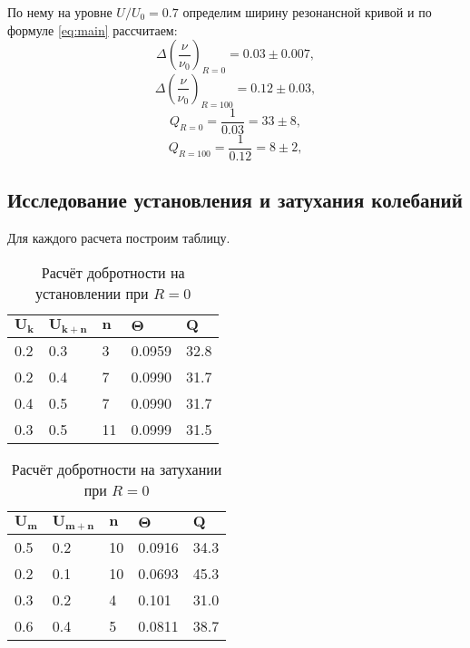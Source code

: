 \documentclass[a4paper]{article}
\begin{document}
По нему на уровне $ U/U_0 = 0.7 $ определим ширину резонансной кривой и по формуле \eqref{eq:main} рассчитаем:
\begin{equation*}\label{key}
	\Delta (\frac{\nu}{\nu_0})_{R=0} = 0.03 \pm 0.007,
\end{equation*}
\begin{equation*}\label{key}
	\Delta (\frac{\nu}{\nu_0})_{R=100} = 0.12 \pm 0.03 ,
\end{equation*}
\begin{equation}\label{key}
	Q_{R=0} = \frac{1}{0.03} = 33 \pm 8,
\end{equation}
\begin{equation}\label{key}
	Q_{R=100} = \frac{1}{0.12} = 8 \pm 2,
\end{equation}

\subsection{Исследование установления и затухания колебаний}

Для каждого расчета построим таблицу.

\begin{table}[h!]
	\centering
	\begin{tabular}{|l|l|l|l|l|}
		\hline
		$\mathbf{U_k}$ & $\mathbf{U_{k+n}}$ & $\mathbf{n}$ & $\mathbf{\Theta}$ & $\mathbf{Q}$  \\ \hline
		0.2   & 0.3     & 3   & 0.0959   & 32.8 \\ \hline
		0.2   & 0.4     & 7   & 0.0990   & 31.7 \\ \hline
		0.4   & 0.5     & 7   & 0.0990   & 31.7 \\ \hline
		0.3   & 0.5     & 11  & 0.0999   & 31.5 \\ \hline
	\end{tabular}
\caption{Расчёт добротности на установлении при $R=0$}
\end{table}

\begin{table}[h!]
	\centering
	\begin{tabular}{|l|l|l|l|l|}
		\hline
		$\mathbf{U_m}$ & $\mathbf{U_{m+n}}$ & $\mathbf{n}$ & $\mathbf{\Theta}$ & $\mathbf{Q}$ \\ \hline
		0.5            & 0.2              & 10           & 0.0916            & 34.3         \\ \hline
		0.2            & 0.1              & 10           & 0.0693            & 45.3         \\ \hline
		0.3            & 0.2              & 4            & 0.101             & 31.0         \\ \hline
		0.6            & 0.4              & 5            & 0.0811            & 38.7         \\ \hline
	\end{tabular}
\caption{Расчёт добротности на затухании при $R=0$}
\end{table}
\end{document}
